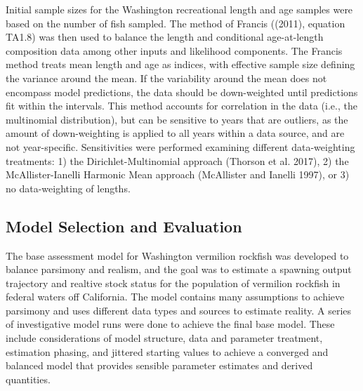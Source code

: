 \documentclass[11pt,
  english,
  a4paper,
]{article}
\begin{document}
Initial sample sizes for the Washington recreational length and age samples were based on the number of fish sampled. The method of Francis ({(2011)\leavevmode\tagmcend\tagstructend}, equation TA1.8) was then used to balance the length and conditional age-at-length composition data among other inputs and likelihood components. The Francis method treats mean length and age as indices, with effective sample size defining the variance around the mean. If the variability around the mean does not encompass model predictions, the data should be down-weighted until predictions fit within the intervals. This method accounts for correlation in the data (i.e., the multinomial distribution), but can be sensitive to years that are outliers, as the amount of down-weighting is applied to all years within a data source, and are not year-specific. Sensitivities were performed examining different data-weighting treatments: 1) the Dirichlet-Multinomial approach {(Thorson et al. 2017)\leavevmode\tagmcend\tagstructend}, 2) the McAllister-Ianelli Harmonic Mean approach {(McAllister and Ianelli 1997)\leavevmode\tagmcend\tagstructend}, or 3) no data-weighting of lengths.

\leavevmode\tagmcend\tagstructend\par


\hypertarget{model-selection-and-evaluation}{%
\subsection{Model Selection and Evaluation}\label{model-selection-and-evaluation}}

\leavevmode\tagmcend\tagstructend


The base assessment model for Washington vermilion rockfish was developed to balance parsimony and realism, and the goal was to estimate a spawning output trajectory and realtive stock status for the population of vermilion rockfish in federal waters off California. The model contains many assumptions to achieve parsimony and uses different data types and sources to estimate reality. A series of investigative model runs were done to achieve the final base model. These include considerations of model structure, data and parameter treatment, estimation phasing, and jittered starting values to achieve a converged and balanced model that provides sensible parameter estimates and derived quantities.
\end{document}
